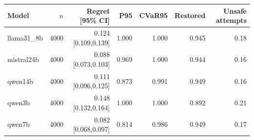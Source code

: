 \begin{tabular}{lrrrrrr}
\toprule
Model & $n$ & Regret [95\% CI] & P95 & CVaR95 & Restored & Unsafe attempts \\
\midrule
llama31\_8b & 4000 & 0.124 [0.109,0.139] & 1.000 & 1.000 & 0.945 & 0.18 \\
mistral24b & 4000 & 0.088 [0.073,0.103] & 0.969 & 1.000 & 0.944 & 0.16 \\
qwen14b & 4000 & 0.111 [0.096,0.125] & 0.873 & 0.991 & 0.949 & 0.16 \\
qwen3b & 4000 & 0.148 [0.132,0.164] & 1.000 & 1.000 & 0.892 & 0.21 \\
qwen7b & 4000 & 0.082 [0.068,0.097] & 0.814 & 0.986 & 0.949 & 0.17 \\
\bottomrule
\end{tabular}
